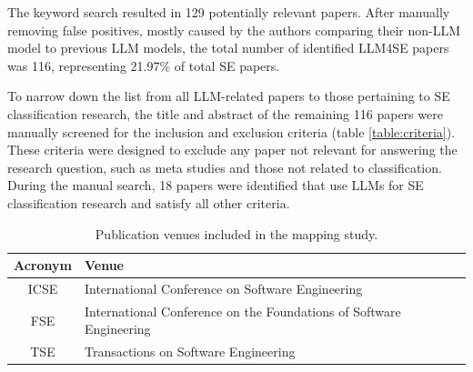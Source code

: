 \documentclass[a4paper]{article}
\begin{document}
The keyword search resulted in 129 potentially relevant papers. After manually removing false positives, mostly caused by the authors comparing their non-LLM model to previous LLM models, the total number of identified LLM4SE papers was 116, representing 21.97\% of total SE papers. 

To narrow down the list from all LLM-related papers to those pertaining to SE classification research, the title and abstract of the remaining 116 papers were manually screened for the inclusion and exclusion criteria (table \ref{table:criteria}). These criteria were designed to exclude any paper not relevant for answering the research question, such as meta studies and those not related to classification. During the manual search, 18 papers were identified that use LLMs for SE classification research and satisfy all other criteria. 

\begin{table}[H]
    \raggedright
    \caption{Publication venues included in the mapping study.}
    \begin{tabularx}{\textwidth}{|c|X|} \hline
        \textbf{Acronym} & \textbf{Venue} \\ \hline
        ICSE  & International Conference on Software Engineering \\ \hline
        FSE   & International Conference on the Foundations of Software Engineering \\ \hline
        TSE   & Transactions on Software Engineering \\ \hline
    \end{tabularx}
    \label{table:venues}
\end{table}
\end{document}
